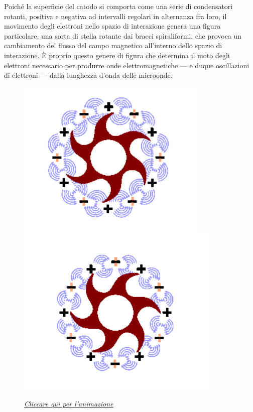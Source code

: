 \documentclass{article}
\begin{document}
{Poiché la superficie del catodo si comporta come una serie di condensatori rotanti, positiva e negativa ad intervalli regolari in alternanza fra loro, il movimento degli elettroni nello spazio di interazione genera una figura particolare, una sorta di stella rotante dai bracci spiraliformi, che provoca un cambiamento del flusso del campo magnetico all'interno dello spazio di interazione. È proprio questo genere di figura che determina il moto degli elettroni necessario per produrre  onde elettromagnetiche — e duque oscillazioni di elettroni — dalla lunghezza d'onda delle microonde.  
\begin{figure}[h]
    \centering
    \includegraphics[scale=0.60]{8.PNG} 
    \includegraphics[scale=0.60]{9.PNG}
    \caption*{\href{https://www.radartutorial.eu/08.transmitters/pic/mag06.gif}{\textit{\underline{Cliccare qui per l'animazione}}}}
    \label{}
\end{figure}
}
\end{document}
